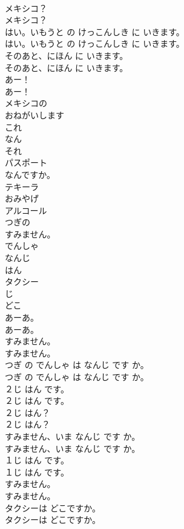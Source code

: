 \documentclass[8pt]{extreport}
\begin{document}
\begin{CJK}{UTF8}{min}
\\	メキシコ？	
\\	メキシコ？ 
\\	はい。いもうと の けっこんしき に いきます。	
\\	はい。いもうと の けっこんしき に いきます。 
\\	そのあと、にほん に いきます。	
\\	そのあと、にほん に いきます。 
\\	あー！	
\\	あー！ 
\\	メキシコの
\\	おねがいします
\\	これ
\\	なん
\\	それ
\\	パスポート
\\	なんですか。
\\	テキーラ
\\	おみやげ
\\	アルコール
\\	つぎの
\\	すみません。
\\	でんしゃ
\\	なんじ
\\	はん
\\	タクシー
\\	じ
\\	どこ
\\	あーあ。	
\\	あーあ。 
\\	すみません。	
\\	すみません。 
\\	つぎ の でんしゃ は なんじ です か。	
\\	つぎ の でんしゃ は なんじ です か。 
\\	２じ はん です。	
\\	２じ はん です。 
\\	２じ はん？	
\\	２じ はん？ 
\\	すみません、いま なんじ です か。	
\\	すみません、いま なんじ です か。 
\\	１じ はん です。	
\\	１じ はん です。 
\\	すみません。	
\\	すみません。 
\\	タクシーは どこですか。	
\\	タクシーは どこですか。 

\end{CJK}
\end{document}
